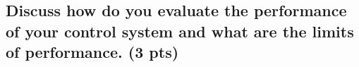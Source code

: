 \subsection{Discuss how do you evaluate the performance of your control system and what are the limits of performance. (3 pts)}
\vspace{10pt}


